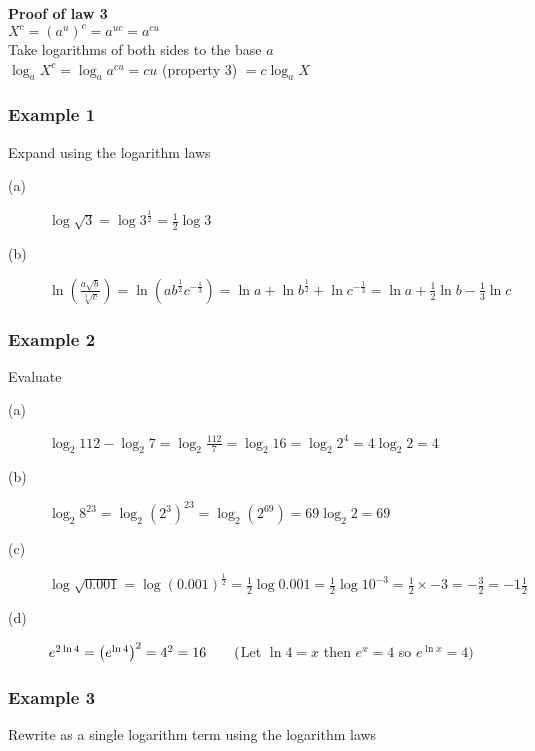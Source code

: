 \textbf{Proof of law 3} \\\relax $X^{c} =\left (a^{u}\right )^{c} =a^{u c} =a^{c u}$ \\\relax Take logarithms of both sides to the base $a$ \\\relax $\log _{a} X^{c} =\log _{a} a^{c u} =c u$ {\scriptsize (property 3)} $ =c \log _{a} X$ 

\subsubsection{Example 1}
Expand using the logarithm laws 


\begin{description}
\item [(a)] $\log  \sqrt{3} =\log  3^{\frac{1}{2}} =\frac{1}{2} \log  3$ 

\item [(b)] $\ln  \genfrac{(}{)}{}{}{a \sqrt{b}}{\sqrt[{3}]{c}} =\ln  \left (a b^{\frac{1}{2}} c^{ -\frac{1}{3}}\right ) =\ln  a +\ln  b^{\frac{1}{2}} +\ln  c^{ -\frac{1}{3}} =\ln  a +\frac{1}{2} \ln  b -\frac{1}{3} \ln  c$ \end{description}

\subsubsection{Example 2}
Evaluate 


\begin{description}
\item [(a)] $\log _{2} 112 -\log _{2} 7 =\log _{2} \frac{112}{7} =\log _{2} 16 =\log _{2} 2^{4} =4 \log _{2} 2 =4$ 

\item [(b)] $\log _{2} 8^{23} =\log _{2} \left (2^{3}\right )^{23} =\log _{2} \left (2^{69}\right ) =69 \log _{2} 2 =69$ 

\item [(c)] $\log  \sqrt{0.001} =\log  \left (0.001\right )^{\frac{1}{2}} =\frac{1}{2} \log  0.001 =\frac{1}{2} \log  10^{ -3} =\frac{1}{2} \times  -3 = -\frac{3}{2} = -1\frac{1}{2}$ 

\item [(d)] $e^{2 \ln  4} =\left (e^{\ln  4}\right )^{2} =4^{2} =16\text{\quad \quad }($Let $\ln  4 =x$ then $e^{x} =4$ so $e^{\ln  x} =4)$ \end{description}

\subsubsection{Example 3}
Rewrite as a single logarithm term using the logarithm laws 


